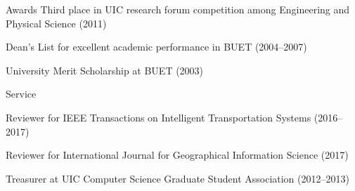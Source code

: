 \begin{list}
\item[Awards\hfill]
Third place in UIC research forum competition among Engineering and Physical Science (2011)

Dean’s List for excellent academic performance in BUET (2004--2007)

University Merit Scholarship at BUET (2003)


\item[Service\hfill] 

Reviewer for IEEE Transactions on Intelligent Transportation Systems (2016--2017) 

Reviewer for International Journal for Geographical Information Science (2017) 

Treasurer at UIC Computer Science Graduate Student Association (2012--2013)

\end{list}









